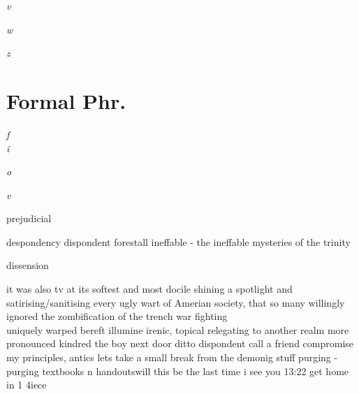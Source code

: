 \begin{multicols}{2}
\lettrine{\textit{v}}{} \\


\lettrine{\textit{w}}{} \\



\lettrine{\textit{z}}{} \\



\end{multicols}

\newpage

\section*{Formal Phr.}

\begin{multicols}{2}

\lettrine{\textit{f}}{} \\

\lettrine{\textit{i}}{} \\


\lettrine{\textit{o}}{} \\


\lettrine{\textit{v}}{} \\


\end{multicols}


prejudicial

despondency
dispondent
forestall
ineffable - the ineffable mysteries of the trinity

dissension

it was also tv at its softest and most docile
shining a spotlight and satirising/sanitising every ugly wart of Amerian society, that so many willingly ignored
the zombification of the
trench war fighting\\
uniquely warped
bereft illumine irenic, topical relegating to another realm
more pronounced
kindred
the boy next door
ditto
dispondent
call a friend
compromise my principles, antics
lets take a small break from the demonig stuff
purging - purging textbooks n handoutswill this be the last time i see you
13:22
get home in 1 4iece


